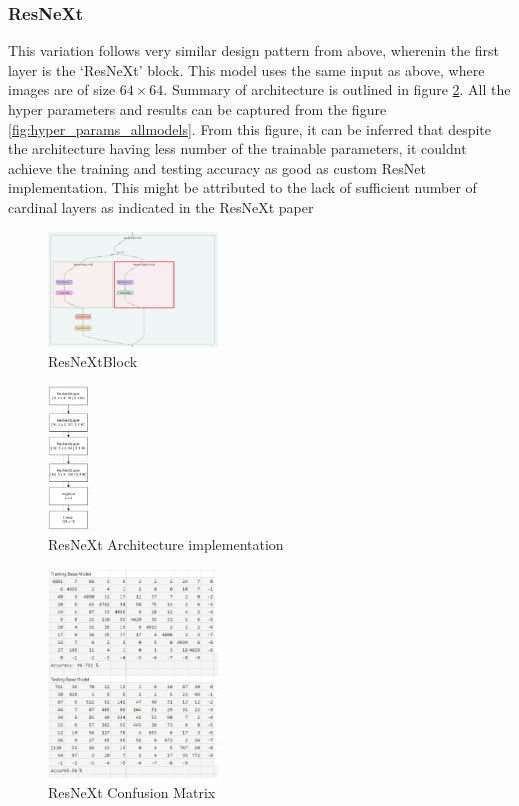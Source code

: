 \documentclass[conference]{IEEEtran}
\begin{document}
	
		\subsubsection{ResNeXt}
		This variation follows very similar design pattern from above, wherenin the first layer is the `ResNeXt' block. This model uses the same input as above, where images are of size $64 \times 64$. Summary of architecture is outlined in figure \ref{fig:resnext_architecture}. All the hyper parameters and results can be captured from the figure \ref{fig:hyper_params_allmodels}. From this figure, it can be inferred that despite the architecture having less number of the trainable parameters, it couldnt achieve the training and testing accuracy as good as custom ResNet implementation. This might be attributed to the lack of sufficient number of cardinal layers as indicated in the ResNeXt paper
		
		\begin{figure}
			\centering
			\includegraphics[width=0.4\textwidth]{models/ResNeXt.png}
			\caption{ResNeXtBlock}
			\label{fig:resnext_block}
		\end{figure}
		
		\begin{figure}
			\centering
			\includegraphics[width=0.1\textwidth]{models/ResNeXtModel.png}
			\caption{ResNeXt Architecture implementation}
			\label{fig:resnext_architecture}
		\end{figure}
		
		\begin{figure}
			\centering
			\includegraphics[width=0.4\textwidth]{CM/resnext.png}
			\caption{ResNeXt Confusion Matrix}
			\label{fig:resnext_cm}
		\end{figure}
	
\end{document}
